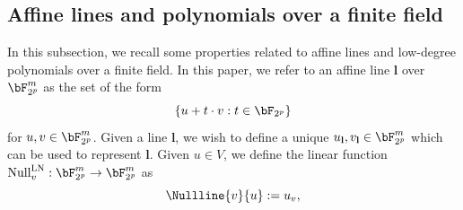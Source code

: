 \subsection{Affine lines and polynomials over a finite field}
In this subsection, we recall some properties related to affine lines and low-degree polynomials over a finite field. In this paper, we refer to an affine line $\textbf{l}$ over $\bF_{2^p}^m$ as the set of the form
\begin{equation*}
	\{ u + t \cdot v: t \in \bF_{2^p}\}
\end{equation*}
for $u, v \in \bF_{2^p}^m$. Given a line $\textbf{l}$, we wish to define a unique $u_\textbf{l}, v_\textbf{l} \in \bF_{2^p}^m$ which can be used to represent $\textbf{l}$. Given $u \in V$, we define the linear function $\text{Null}_{v}^{\text{LN}}: \bF_{2^p}^m \rightarrow \bF_{2^p}^m $ as 
\begin{equation*}
	\Nullline{v}{u} := u_v,
\end{equation*}

